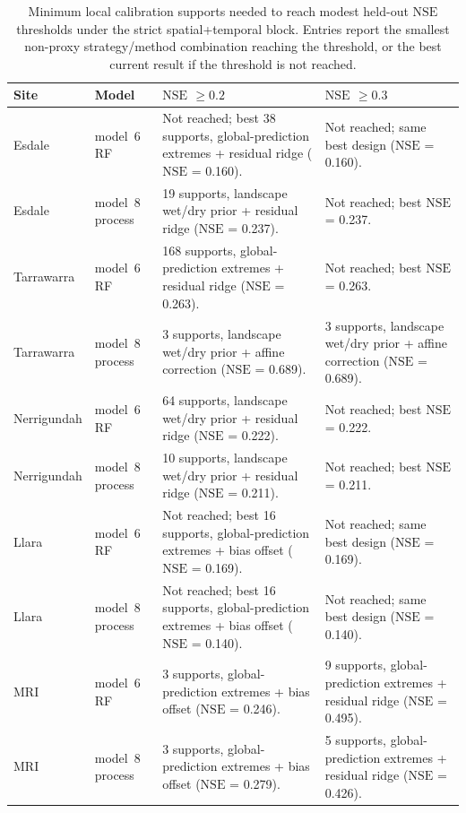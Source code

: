 \documentclass[11pt,a4paper]{article}
\newcommand{\nse}{\ensuremath{\mathrm{NSE}}}
\newcommand{\modelSix}{model~6 RF}
\newcommand{\modelEight}{model~8 process}
\begin{document}
\begin{table}[htbp]
\centering
\small
\caption{Minimum local calibration supports needed to reach modest held-out
\nse{} thresholds under the strict spatial+temporal block.  Entries report the
smallest non-proxy strategy/method combination reaching the threshold, or the
best current result if the threshold is not reached.}
\label{tab:min-budget}
\begin{tabularx}{\textwidth}{llXX}
\toprule
Site & Model & \nse{} $\geq 0.2$ & \nse{} $\geq 0.3$ \\
\midrule
Esdale & \modelSix{} &
Not reached; best 38 supports, global-prediction extremes + residual ridge
(\nse{} = 0.160). &
Not reached; same best design (\nse{} = 0.160). \\
Esdale & \modelEight{} &
19 supports, landscape wet/dry prior + residual ridge (\nse{} = 0.237). &
Not reached; best \nse{} = 0.237. \\
Tarrawarra & \modelSix{} &
168 supports, global-prediction extremes + residual ridge (\nse{} = 0.263). &
Not reached; best \nse{} = 0.263. \\
Tarrawarra & \modelEight{} &
3 supports, landscape wet/dry prior + affine correction (\nse{} = 0.689). &
3 supports, landscape wet/dry prior + affine correction (\nse{} = 0.689). \\
Nerrigundah & \modelSix{} &
64 supports, landscape wet/dry prior + residual ridge (\nse{} = 0.222). &
Not reached; best \nse{} = 0.222. \\
Nerrigundah & \modelEight{} &
10 supports, landscape wet/dry prior + residual ridge (\nse{} = 0.211). &
Not reached; best \nse{} = 0.211. \\
Llara & \modelSix{} &
Not reached; best 16 supports, global-prediction extremes + bias offset
(\nse{} = 0.169). &
Not reached; same best design (\nse{} = 0.169). \\
Llara & \modelEight{} &
Not reached; best 16 supports, global-prediction extremes + bias offset
(\nse{} = 0.140). &
Not reached; same best design (\nse{} = 0.140). \\
MRI & \modelSix{} &
3 supports, global-prediction extremes + bias offset (\nse{} = 0.246). &
9 supports, global-prediction extremes + residual ridge (\nse{} = 0.495). \\
MRI & \modelEight{} &
3 supports, global-prediction extremes + bias offset (\nse{} = 0.279). &
5 supports, global-prediction extremes + residual ridge (\nse{} = 0.426). \\
\bottomrule
\end{tabularx}
\end{table}
\end{document}
